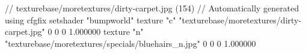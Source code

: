 // texturebase/moretextures/dirty-carpet.jpg (154)
// Automatically generated using cfgfix
setshader "bumpworld"
texture "c" "texturebase/moretextures/dirty-carpet.jpg" 0 0 0 1.000000
texture "n" "texturebase/moretextures/specials/bluehairs_n.jpg" 0 0 0 1.000000
